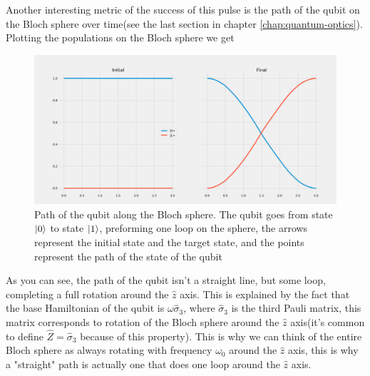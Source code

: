 \documentclass[english, a4paper, 12pt, twoside]{article}
\numberwithin{equation}{section} %
\begin{document}
Another interesting metric of the success of this pulse is the path of the qubit on the Bloch sphere over time(see the last section in chapter \ref{chap:quantum-optics}). Plotting the populations on the Bloch sphere we get 
\begin{figure}[H]
    \centering %
    \includegraphics[width=1\columnwidth]{Results/qubit-band-amp-const/level-population.png}
    \caption{Path of the qubit along the Bloch sphere. The qubit goes from state $\ket{0}$ to state $\ket{1}$, preforming one loop on the sphere, the arrows represent the initial state and the target state, and the points represent the path of the state of the qubit}
    \label{fig:band-amp-const-blcoh}
\end{figure}
As you can see, the path of the qubit isn't a straight line, but some loop, completing a full rotation around the $\hat{z}$ axis. This is explained by the fact that the base Hamiltonian of the qubit is $\omega \hat{\sigma}_3$, where $\hat{\sigma}_3$ is the third Pauli matrix, this matrix corresponds to rotation of the Bloch sphere around the $\hat{z}$ axis(it's common to define $\hat{Z} = \hat{\sigma}_3$ because of this property). This is why we can think of the entire Bloch sphere as always rotating with frequency $\omega_0$ around the $\hat{z}$ axis, this is why a "straight" path is actually one that does one loop around the $\hat{z}$ axis.
\end{document}
